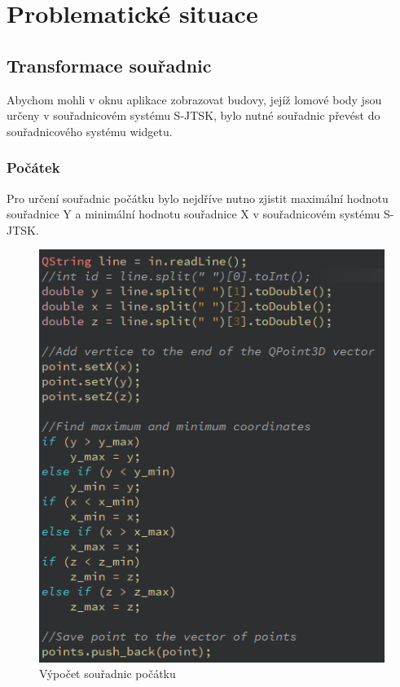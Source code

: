 \documentclass[11pt]{article}
\begin{document}
\clearpage

\section{Problematické situace}
	
\subsection{Transformace souřadnic}
	Abychom mohli v oknu aplikace zobrazovat budovy, jejíž lomové body jsou určeny v souřadnicovém systému S-JTSK, bylo nutné souřadnic převést do souřadnicového systému widgetu. 
	
\subsubsection{Počátek}
	Pro určení souřadnic počátku bylo nejdříve nutno zjistit maximální hodnotu souřadnice Y a minimální hodnotu souřadnice X v souřadnicovém systému S-JTSK. 
	
\begin{figure}[htbh]
	\centering
	\includegraphics[scale=0.8]{images/U2_problem_pocatek.png} 
	\caption{Výpočet souřadnic počátku}
	\label{fig:problem_origin}
\end{figure} 
	
\end{document}
